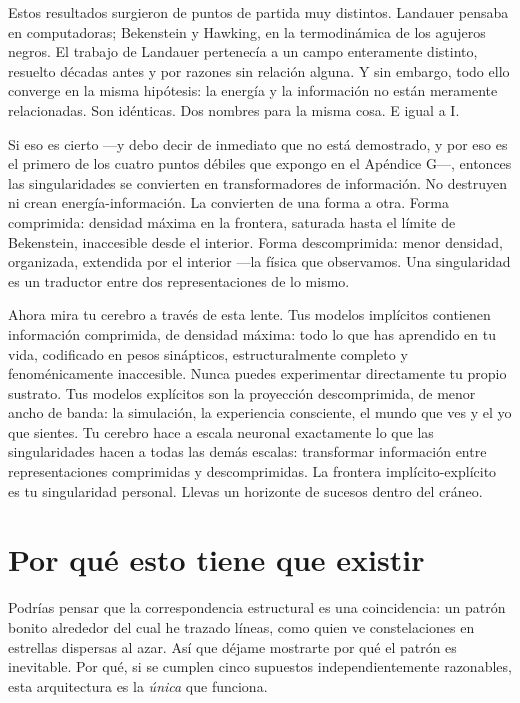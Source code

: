 \documentclass[11pt, twoside, openright]{book}
\begin{document}
Estos resultados surgieron de puntos de partida muy distintos. Landauer pensaba en computadoras; Bekenstein y Hawking, en la termodinámica de los agujeros negros. El trabajo de Landauer pertenecía a un campo enteramente distinto, resuelto décadas antes y por razones sin relación alguna. Y sin embargo, todo ello converge en la misma hipótesis: la energía y la información no están meramente relacionadas. Son idénticas. Dos nombres para la misma cosa. E igual a I.

Si eso es cierto ---y debo decir de inmediato que no está demostrado, y por eso es el primero de los cuatro puntos débiles que expongo en el Apéndice G---, entonces las singularidades se convierten en transformadores de información. No destruyen ni crean energía-información. La convierten de una forma a otra. Forma comprimida: densidad máxima en la frontera, saturada hasta el límite de Bekenstein, inaccesible desde el interior. Forma descomprimida: menor densidad, organizada, extendida por el interior ---la física que observamos. Una singularidad es un traductor entre dos representaciones de lo mismo.

Ahora mira tu cerebro a través de esta lente. Tus modelos implícitos contienen información comprimida, de densidad máxima: todo lo que has aprendido en tu vida, codificado en pesos sinápticos, estructuralmente completo y fenoménicamente inaccesible. Nunca puedes experimentar directamente tu propio sustrato. Tus modelos explícitos son la proyección descomprimida, de menor ancho de banda: la simulación, la experiencia consciente, el mundo que ves y el yo que sientes. Tu cerebro hace a escala neuronal exactamente lo que las singularidades hacen a todas las demás escalas: transformar información entre representaciones comprimidas y descomprimidas. La frontera implícito-explícito es tu singularidad personal. Llevas un horizonte de sucesos dentro del cráneo.

\section*{Por qué esto tiene que existir}

Podrías pensar que la correspondencia estructural es una coincidencia: un patrón bonito alrededor del cual he trazado líneas, como quien ve constelaciones en estrellas dispersas al azar. Así que déjame mostrarte por qué el patrón es inevitable. Por qué, si se cumplen cinco supuestos independientemente razonables, esta arquitectura es la \textit{única} que funciona.
\end{document}
